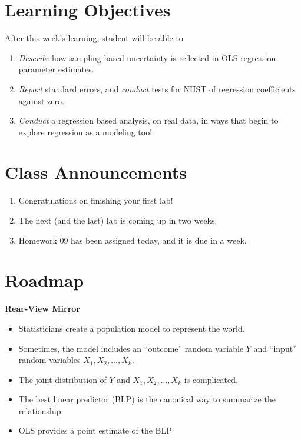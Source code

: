 \documentclass[
]{book}
\providecommand{\tightlist}{%
  \setlength{\itemsep}{0pt}\setlength{\parskip}{0pt}}
\theoremstyle{definition}
\theoremstyle{definition}
\theoremstyle{definition}
\theoremstyle{definition}
\theoremstyle{remark}
\begin{document}
\section{Learning Objectives}\label{learning-objectives-8}

After this week's learning, student will be able to

\begin{enumerate}
\def\labelenumi{\arabic{enumi}.}
\tightlist
\item
  \emph{Describe} how sampling based uncertainty is reflected in OLS regression parameter estimates.
\item
  \emph{Report} standard errors, and \emph{conduct} tests for NHST of regression coefficients against zero.
\item
  \emph{Conduct} a regression based analysis, on real data, in ways that begin to explore regression as a modeling tool.
\end{enumerate}

\section{Class Announcements}\label{class-announcements-7}

\begin{enumerate}
\def\labelenumi{\arabic{enumi}.}
\tightlist
\item
  Congratulations on finishing your first lab!
\item
  The next (and the last) lab is coming up in two weeks.
\item
  Homework 09 has been assigned today, and it is due in a week.
\end{enumerate}

\section{Roadmap}\label{roadmap-5}

\textbf{Rear-View Mirror}

\begin{itemize}
\tightlist
\item
  Statisticians create a population model to represent the world.
\item
  Sometimes, the model includes an ``outcome'' random variable \(Y\) and ``input'' random variables \(X_1, X_2,...,X_k\).
\item
  The joint distribution of \(Y\) and \(X_1, X_2,...,X_k\) is complicated.
\item
  The best linear predictor (BLP) is the canonical way to summarize the relationship.
\item
  OLS provides a point estimate of the BLP
\end{itemize}
\end{document}

